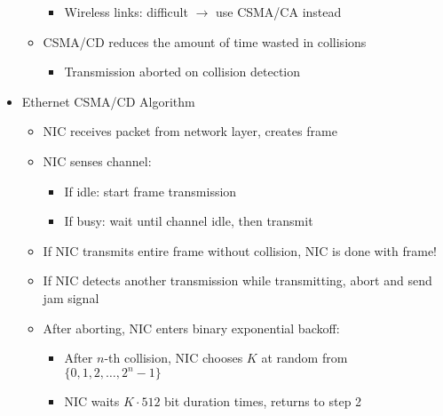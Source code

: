\begin{itemize}
\begin{itemize}
\begin{itemize}
          \item Wireless links: difficult $\to$ use CSMA/CA instead

        \end{itemize}

      \item CSMA/CD reduces the amount of time wasted in collisions

        \begin{itemize}

          \item Transmission aborted on collision detection

        \end{itemize}

    \end{itemize}

  \item Ethernet CSMA/CD Algorithm

    \begin{itemize}

      \item NIC receives packet from network layer, creates frame

      \item NIC senses channel:

        \begin{itemize}

          \item If idle: start frame transmission

          \item If busy: wait until channel idle, then transmit

        \end{itemize}

      \item If NIC transmits entire frame without collision, NIC is done with frame!

      \item If NIC detects another transmission while transmitting, abort and send jam signal

      \item After aborting, NIC enters binary exponential backoff:

        \begin{itemize}

          \item After $n$-th collision, NIC chooses $K$ at random from $\{0,1,2,\ldots,2^n-1\}$

          \item NIC waits $K\cdot512$ bit duration times, returns to step 2


\end{itemize}
\end{itemize}
\end{itemize}
